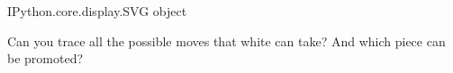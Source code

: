 \documentclass[letterpaper,10pt,english]{jupyterBook}
\begin{document}
\begin{sphinxVerbatim}[commandchars=\\\{\}]
\PYGZlt{}IPython.core.display.SVG object\PYGZgt{}
\end{sphinxVerbatim}

\sphinxAtStartPar
{} Can you trace all the possible moves that white can take? And which piece can be promoted?







\renewcommand{\indexname}{Index}
\printindex
\end{document}
